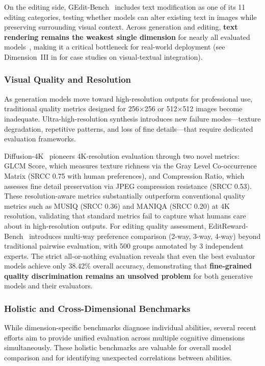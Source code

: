 \documentclass{llmxive}
\begin{document}
On the editing side, GEdit-Bench~\citep{Liu2025Step1XEditAP} includes text modification as one of its 11 editing categories, testing whether models can alter existing text in images while preserving surrounding visual context. Across generation and editing, \textbf{text rendering remains the weakest single dimension} for nearly all evaluated models~\citep{OneIG-Bench}, making it a critical bottleneck for real-world deployment (see Dimension~III in  for case studies on visual-textual integration).

\subsubsection{Visual Quality and Resolution}

As generation models move toward high-resolution outputs for professional use, traditional quality metrics designed for 256$\times$256 or 512$\times$512 images become inadequate. Ultra-high-resolution synthesis introduces new failure modes---texture degradation, repetitive patterns, and loss of fine details---that require dedicated evaluation frameworks.

Diffusion-4K~\citep{Diffusion-4K} pioneers 4K-resolution evaluation through two novel metrics: GLCM Score, which measures texture richness via the Gray Level Co-occurrence Matrix (SRCC 0.75 with human preferences), and Compression Ratio, which assesses fine detail preservation via JPEG compression resistance (SRCC 0.53). These resolution-aware metrics substantially outperform conventional quality metrics such as MUSIQ (SRCC 0.36) and MANIQA (SRCC 0.20) at 4K resolution, validating that standard metrics fail to capture what humans care about in high-resolution outputs. For editing quality assessment, EditReward-Bench~\citep{wu2025editreward} introduces multi-way preference comparison (2-way, 3-way, 4-way) beyond traditional pairwise evaluation, with 500 groups annotated by 3 independent experts. The strict all-or-nothing evaluation reveals that even the best evaluator models achieve only 38.42\% overall accuracy, demonstrating that \textbf{fine-grained quality discrimination remains an unsolved problem} for both generative models and their evaluators.


\subsubsection{Holistic and Cross-Dimensional Benchmarks}

While dimension-specific benchmarks diagnose individual abilities, several recent efforts aim to provide unified evaluation across multiple cognitive dimensions simultaneously. These holistic benchmarks are valuable for overall model comparison and for identifying unexpected correlations between abilities.
\end{document}
